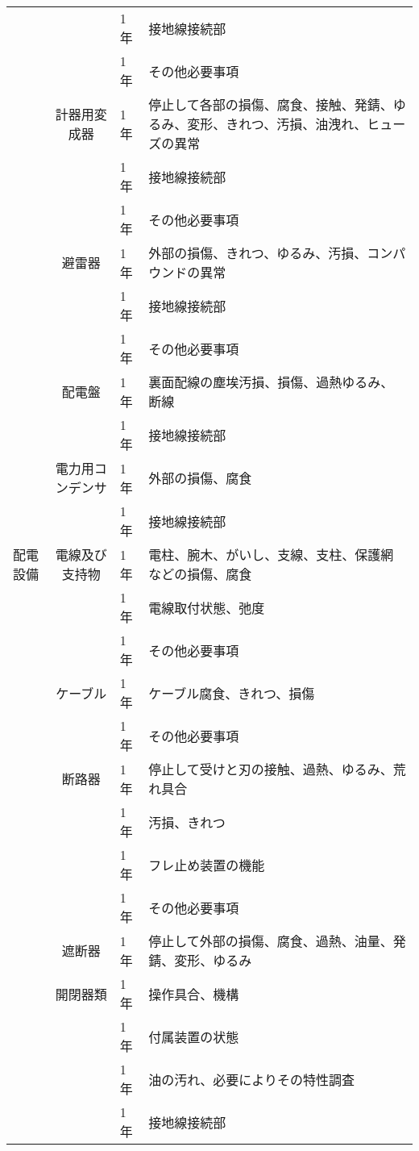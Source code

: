 \documentclass[10pt,a4paper,uplatex]{jsarticle}
\begin{document}
\begin{table}[b]
\begin{tabular}{|l|c|p{1cm}|p{10cm}|}
    &              & 1年 & 接地線接続部  \\ 
    &              & 1年 & その他必要事項  \\ \cline{2-4}
    &計器用変成器    & 1年 & 停止して各部の損傷、腐食、接触、発錆、ゆるみ、変形、きれつ、汚損、油洩れ、ヒューズの異常  \\
    &              & 1年 & 接地線接続部  \\
    &              & 1年 & その他必要事項  \\ \cline{2-4}
    &避雷器         & 1年 & 外部の損傷、きれつ、ゆるみ、汚損、コンパウンドの異常  \\
    &              & 1年 & 接地線接続部  \\ 
    &              & 1年 & その他必要事項  \\ \cline{2-4}
    &配電盤         & 1年 & 裏面配線の塵埃汚損、損傷、過熱ゆるみ、断線  \\
    &              & 1年 & 接地線接続部  \\\cline{2-4}
    &電力用コンデンサ& 1年 & 外部の損傷、腐食  \\
    &              & 1年 & 接地線接続部  \\ \cline{2-4}
    \hline  
配電設備
    &電線及び支持物  & 1年 & 電柱、腕木、がいし、支線、支柱、保護網などの損傷、腐食  \\
    &              & 1年 & 電線取付状態、弛度  \\
    &              & 1年 & その他必要事項  \\ \cline{2-4}
    &ケーブル       & 1年 & ケーブル腐食、きれつ、損傷  \\
    &              & 1年 & その他必要事項  \\ \cline{2-4}
    &断路器         & 1年 & 停止して受けと刃の接触、過熱、ゆるみ、荒れ具合  \\
    &              & 1年 & 汚損、きれつ  \\
    &              & 1年 & フレ止め装置の機能  \\
    &              & 1年 & その他必要事項  \\ \cline{2-4}
    &遮断器         & 1年 & 停止して外部の損傷、腐食、過熱、油量、発錆、変形、ゆるみ  \\ 
    &開閉器類       & 1年 & 操作具合、機構  \\
    &              & 1年 & 付属装置の状態  \\
    &              & 1年 & 油の汚れ、必要によりその特性調査  \\
    &              & 1年 & 接地線接続部  \\

\end{tabular}
\end{table}
\end{document}
